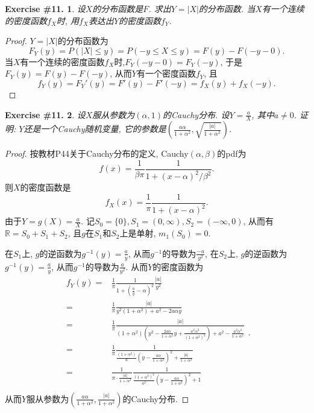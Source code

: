 \documentclass[UTF8, a4paper]{article}
\newtheorem{exercise}{Exercise \#11.}
\begin{document}
\begin{framed}
\begin{exercise}
设\(X\)的分布函数是\(F\). 求出\(Y = |X|\)的分布函数. 当\(X\)有一个连续的密度函数\(f_X\)时, 用\(f_X\)表达出\(Y\)的密度函数\(f_Y\).
\end{exercise}
\end{framed}

\begin{proof}
\(Y = |X|\)的分布函数为
$$
F_Y(y) = P(|X| \leq y) = P(-y \leq X \leq y) = F(y) - F(-y - 0).
$$
当\(X\)有一个连续的密度函数\(f_X\)时,\(F_Y(-y-0) = F_Y(-y)\), 于是\(F_Y(y) = F(y) - F(-y)\), 从而\(Y\)有一个密度函数\(f_Y\), 且
$$
f_Y(y) = F_Y'(y) = F'(y) - F'(-y) = f_X(y) + f_X(-y).
$$
\end{proof}



\begin{framed}
\begin{exercise}
设\(X\)服从参数为\(\left(\alpha, 1\right)\)的Cauchy分布.
设\(Y = \frac{a}{X}\), 其中\(a \neq 0\). 证明: \(Y\)还是一个Cauchy随机变量, 它的参数是\(\left(\frac{a\alpha}{1+\alpha^2}, \sqrt{\frac{|a|}{1+\alpha^2}}\right)\).
\end{exercise}
\end{framed}

\begin{proof}
按教材P44关于Cauchy分布的定义, Cauchy\((\alpha, \beta)\)的pdf为
$$
f(x) = \frac{1}{\beta \pi}\frac{1}{1+(x-\alpha)^2/\beta^2}.
$$
则\(X\)的密度函数是 
$$
f_X(x) = \frac{1}{\pi}\frac{1}{1+(x - \alpha)^2}.
$$
由于\(Y = g(X) = \frac{a}{X}\). 记\(S_0 = \{0\}, S_1 = (0, \infty), S_2 = (-\infty, 0)\),
从而有\(\mathbb{R} = S_0 + S_1 + S_2\), 且\(g\)在\(S_1\)和\(S_2\)上是单射, \(m_1(S_0) = 0\).

在\(S_1\)上, \(g\)的逆函数为\(g^{-1}(y) = \frac{a}{y}\), 从而\(g^{-1}\)的导数为\(\frac{-a}{y^2}\), 
在\(S_2\)上, \(g\)的逆函数为\(g^{-1}(y) = \frac{a}{y}\), 从而\(g^{-1}\)的导数为\(\frac{a}{y^2}\).
从而\(Y\)的密度函数为
$$
\begin{aligned}
    f_Y(y) =& \frac{1}{\pi}\frac{1}{1+\left(\frac{a}{y} - \alpha\right)^2}\frac{|a|}{y^2} \\
    =& \frac{1}{\pi}\frac{|a|}{y^2(1+\alpha^2) + a^2 - 2a\alpha y} \\
    =& \frac{1}{\pi}\frac{|a|}{(1+\alpha^2)\left(y^2 -\frac{2a\alpha}{1+\alpha^2}y + \frac{a^2\alpha^2}{(1+\alpha^2)^2} \right) + a^2 - \frac{a^2\alpha^2}{1+\alpha^2}} \\
    =& \frac{1}{\pi}\frac{1}{\frac{(1+\alpha^2)}{a}\left(y -\frac{a\alpha}{1+\alpha^2}\right)^2 + \frac{|a|}{1+\alpha^2}} \\
    =& \frac{1}{\pi \cdot \frac{|a|}{1+\alpha^2}}\frac{1}{\frac{(1+\alpha^2)^2}{a^2}\left(y -\frac{a\alpha}{1+\alpha^2}\right)^2 + 1} \\
\end{aligned}.
$$
从而\(Y\)服从参数为\(\left(\frac{a\alpha}{1+\alpha^2}, {\frac{|a|}{1+\alpha^2}}\right)\)的Cauchy分布.
\end{proof}
\end{document}
